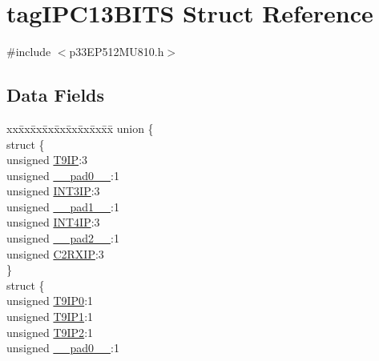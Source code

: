 \hypertarget{structtag_i_p_c13_b_i_t_s}{}\section{tag\+I\+P\+C13\+B\+I\+TS Struct Reference}
\label{structtag_i_p_c13_b_i_t_s}


{\ttfamily \#include $<$p33\+E\+P512\+M\+U810.\+h$>$}

\subsection*{Data Fields}
\begin{DoxyCompactItemize}
\item 
\begin{tabbing}
xx\=xx\=xx\=xx\=xx\=xx\=xx\=xx\=xx\=\kill
union \{\\
\>struct \{\\
\>\>unsigned \hyperlink{structtag_i_p_c13_b_i_t_s_a23fd4279f2d7eb8752f68dc84ba05e40}{T9IP}:3\\
\>\>unsigned \hyperlink{structtag_i_p_c13_b_i_t_s_adf71f3d8410c1f1dbbc96680a92c49af}{\_\_pad0\_\_}:1\\
\>\>unsigned \hyperlink{structtag_i_p_c13_b_i_t_s_a1236285a4101489793d0a26f947f5167}{INT3IP}:3\\
\>\>unsigned \hyperlink{structtag_i_p_c13_b_i_t_s_acaf2d0924a107ec6e8d2e31febaf66f9}{\_\_pad1\_\_}:1\\
\>\>unsigned \hyperlink{structtag_i_p_c13_b_i_t_s_ad8ffd6055eb3ae2f2a04cdb6ddd6a459}{INT4IP}:3\\
\>\>unsigned \hyperlink{structtag_i_p_c13_b_i_t_s_a4d97cc5f7d51d22fc2bf3eab35c9cb7f}{\_\_pad2\_\_}:1\\
\>\>unsigned \hyperlink{structtag_i_p_c13_b_i_t_s_a7ca186b24c6cef870b71fb762ffb3b77}{C2RXIP}:3\\
\>\} \\
\>struct \{\\
\>\>unsigned \hyperlink{structtag_i_p_c13_b_i_t_s_af76401a2ec8bd4668927a716e50e2053}{T9IP0}:1\\
\>\>unsigned \hyperlink{structtag_i_p_c13_b_i_t_s_ab7b34e8310a10ecb1e0e58e679da6494}{T9IP1}:1\\
\>\>unsigned \hyperlink{structtag_i_p_c13_b_i_t_s_a3bcf89c1a7980a15e16a80f0cab8e0fc}{T9IP2}:1\\
\>\>unsigned \hyperlink{structtag_i_p_c13_b_i_t_s_adf71f3d8410c1f1dbbc96680a92c49af}{\_\_pad0\_\_}:1\\

\end{tabbing}
\end{DoxyCompactItemize}
